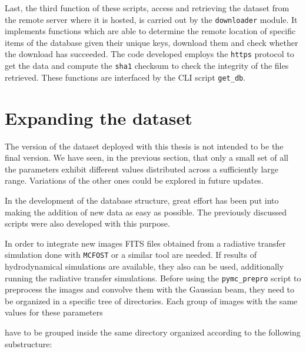 \documentclass[a4paper,10pt]{report}
\begin{document}
Last, the third function of these scripts, access and retrieving the dataset from the remote server where
it is hosted, is carried out by the \lstinline{downloader} module.
It implements functions which are able to determine the remote location of specific items of the database 
given their unique keys, download them and check whether the download has succeeded.
The code developed employs the \lstinline{https} protocol to get the data and compute the \lstinline{sha1} 
checksum to check the integrity of the files retrieved.
These functions are interfaced by the CLI script \lstinline{get_db}.

\section{Expanding the dataset}

The version of the dataset deployed with this thesis is not intended to be the final version. 
We have seen, in the previous section, that only a small set of all the parameters exhibit different values distributed
across a sufficiently large range. Variations of the other ones could be explored in future updates.

In the development of the database structure, great effort has been put into making the addition of new
data as easy as possible. The previously discussed scripts were also developed with this purpose.

In order to integrate new images FITS files obtained from a radiative 
transfer simulation done with \lstinline{MCFOST} or a similar tool are needed. If results of hydrodynamical 
simulations are available, they also can be used, additionally running the radiative transfer simulations.
Before using the \lstinline{pymc_prepro} script to preprocess the images and convolve them with the Gaussian beam,
they need to be organized in a specific tree of directories.
Each group of images with the same values for these parameters


have to be grouped inside the same directory organized according to the following substructure:
\end{document}
